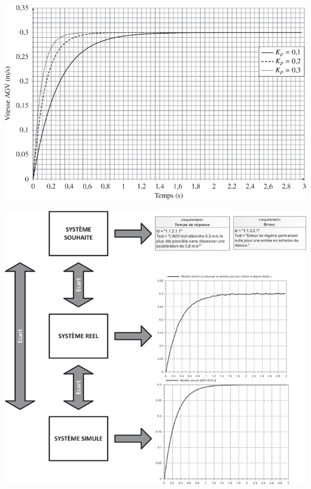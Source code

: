 \begin{multicols}{2}
\begin{multicols}{2}
\begin{center}
\includegraphics[width=\linewidth]{images/ccp_10}
\end{center}


\begin{center}
\includegraphics[width=\linewidth]{images/ccp_11}
\end{center}








\ifprof
\end{multicols}
\else
\end{multicols}
\fi


